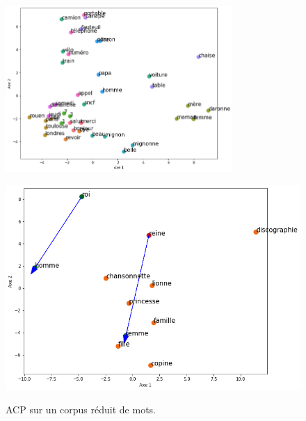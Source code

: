\documentclass[10pt,french,french]{article}
\begin{document}
\begin{figure}[h]
\begin{minipage}{.5\textwidth}
\centering
\includegraphics[width=0.77\textwidth]{img/acp_gensim.png}
\captionsetup{margin=0cm,format=hang,justification=justified}
\caption{ACP sur un corpus réduit de mots.}\label{fig:acp_gensim}
\end{minipage}%
\begin{minipage}{.5\textwidth}
   \centering
  \includegraphics[width=0.8\linewidth]{img/acp_reine.png}
  \label{fig:acp_reine}
\end{minipage}%
\end{figure}
\end{document}
